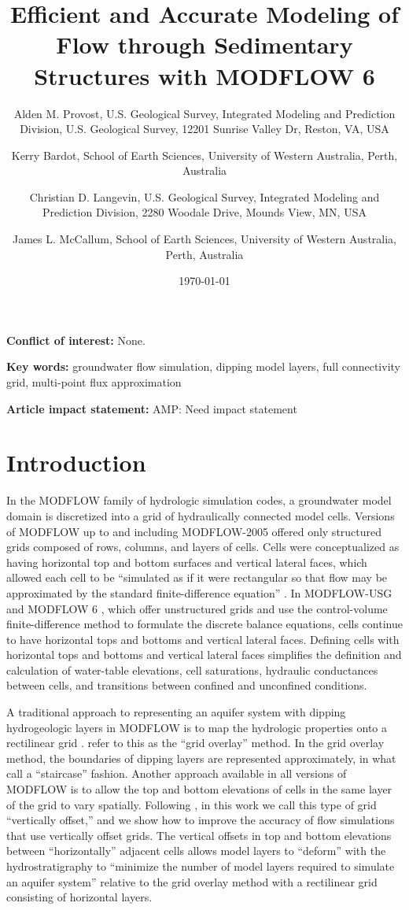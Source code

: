 \documentclass{article}
\title{Efficient and Accurate Modeling of Flow through Sedimentary Structures with MODFLOW 6}
\author{
	Alden M. Provost, U.S. Geological Survey, Integrated Modeling and Prediction Division, U.S. Geological Survey, 12201 Sunrise Valley Dr, Reston, VA, USA  \\
	\and 
	Kerry Bardot, School of Earth Sciences, University of Western Australia, Perth, Australia \\
	\and 
	Christian D. Langevin, U.S. Geological Survey, Integrated Modeling and Prediction Division, 2280 Woodale Drive, Mounds View, MN, USA \\
	\and 
	James L. McCallum, School of Earth Sciences, University of Western Australia, Perth, Australia \\
	}
\date{\today}
\begin{document}
\maketitle

\textbf{Conflict of interest:} None.

\textbf{Key words:} groundwater flow simulation, dipping model layers, full connectivity grid, multi-point flux approximation

\textbf{Article impact statement:} {\color{red} AMP: Need impact statement}

\begin{abstract}
\end{abstract}

\section{Introduction}

In the MODFLOW family of hydrologic simulation codes, a groundwater model domain is discretized into a grid of hydraulically connected model cells. Versions of MODFLOW up to and including MODFLOW-2005 \citep{modflow2005} offered only structured grids composed of rows, columns, and layers of cells. Cells were conceptualized as having horizontal top and bottom surfaces and vertical lateral faces, which allowed each cell to be ``simulated as if it were rectangular so that flow may be approximated by the standard finite-difference equation'' \citep{modflow84}. In MODFLOW-USG \citep{modflowusg} and MODFLOW 6 \citep{modflow6gwf}, which offer unstructured grids and use the control-volume finite-difference method to formulate the discrete balance equations, cells continue to have horizontal tops and bottoms and vertical lateral faces.  Defining cells with horizontal tops and bottoms and vertical lateral faces simplifies the definition and calculation of water-table elevations, cell saturations, hydraulic conductances between cells, and transitions between confined and unconfined conditions.

A traditional approach to representing an aquifer system with dipping hydrogeologic layers in MODFLOW is to map the hydrologic properties onto a rectilinear grid \citep{modflow84}.  \cite{hoaglund2003} refer to this as the ``grid overlay'' method.  In the grid overlay method, the boundaries of dipping layers are represented approximately, in what \cite{bardot2022} call a ``staircase'' fashion.  Another approach available in all versions of MODFLOW is to allow the top and bottom elevations of cells in the same layer of the grid to vary spatially. Following \cite{bardot2022}, in this work we call this type of grid ``vertically offset,'' and we show how to improve the accuracy of flow simulations that use vertically offset grids. The vertical offsets in top and bottom elevations between ``horizontally'' adjacent cells allows model layers to ``deform'' with the hydrostratigraphy to ``minimize the number of model layers required to simulate an aquifer system'' \citep{modflow84} relative to the grid overlay method with a rectilinear grid consisting of horizontal layers.
\end{document}

